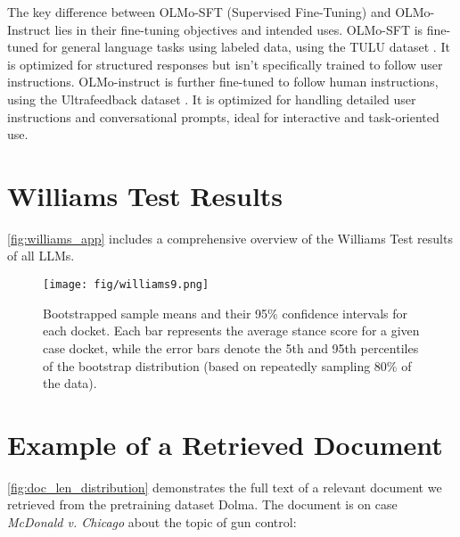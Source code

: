 The key difference between OLMo-SFT (Supervised Fine-Tuning) and OLMo-Instruct lies in their fine-tuning objectives and intended uses.
OLMo-SFT is fine-tuned for general language tasks using labeled data, using the TULU dataset \cite{ivison2023camels}. It is optimized for structured responses but isn’t specifically trained to follow user instructions. OLMo-instruct is further fine-tuned to follow human instructions, using the Ultrafeedback dataset \cite{cui2023ultrafeedback}. It is optimized for handling detailed user instructions and conversational prompts, ideal for interactive and task-oriented use.


\section{Williams Test Results}
\label{app:williams}
\autoref{fig:williams_app} includes a comprehensive overview of the Williams Test results of all LLMs.


\begin{figure*}[]
\centering
\texttt{[image: fig/williams9.png]}
\caption{Bootstrapped sample means and their 95\% confidence intervals for each docket. Each bar represents the average stance score for a given case docket, while the error bars denote the 5th and 95th percentiles of the bootstrap distribution (based on repeatedly sampling 80\% of the data).
}
\label{fig:williams_app}
\end{figure*}

\section{Example of a Retrieved Document}
\label{app:example_doc_text}
\autoref{fig:doc_len_distribution} demonstrates the full text of a relevant document we retrieved from the pretraining dataset Dolma. The document is on case \textit{McDonald v. Chicago} about the topic of gun control:\\

\onecolumn

